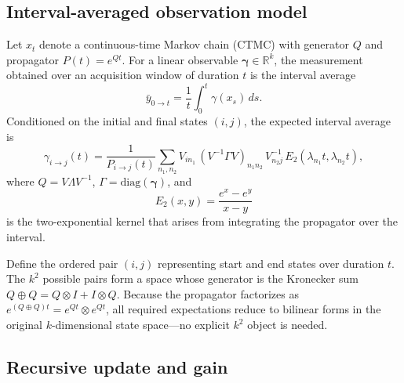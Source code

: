 \documentclass[9pt]{elife}
\begin{document}
\subsection*{Interval-averaged observation model}

Let $x_t$ denote a continuous-time Markov chain (CTMC) with generator $Q$ and propagator $P(t)=e^{Qt}$.  
For a linear observable $\bm{\gamma}\in\mathbb{R}^k$, the measurement obtained over an acquisition window of duration $t$ is the interval average
\[
\bar y_{0\to t} = \frac{1}{t}\int_0^t \gamma(x_s)\,ds.
\]
Conditioned on the initial and final states $(i,j)$, the expected interval average is
\begin{equation}
	\gamma_{i\to j}(t)
	= \frac{1}{P_{i\to j}(t)}
	\sum_{n_1,n_2}
	V_{i n_1}\,(V^{-1}\Gamma V)_{n_1 n_2}\,V^{-1}_{n_2 j}\,
	E_2(\lambda_{n_1} t, \lambda_{n_2} t),
\end{equation}
where $Q=V\Lambda V^{-1}$, $\Gamma=\mathrm{diag}(\bm{\gamma})$, and
\[
E_2(x,y) = \frac{e^{x}-e^{y}}{x-y}
\]
is the two-exponential kernel that arises from integrating the propagator over the interval.

\begin{tcolorbox}[colback=gray!5,colframe=gray!60,title=Boundary-conditioned two-point states (“meta-states”)]
	Define the ordered pair $(i,j)$ representing start and end states over duration $t$.  
	The $k^2$ possible pairs form a space whose generator is the Kronecker sum
	$Q\oplus Q = Q\otimes I + I\otimes Q$.  
	Because the propagator factorizes as $e^{(Q\oplus Q)t}=e^{Qt}\otimes e^{Qt}$, all required expectations reduce to bilinear forms in the original $k$-dimensional state space—no explicit $k^2$ object is needed.
\end{tcolorbox}

\subsection*{Recursive update and gain}
\end{document}
